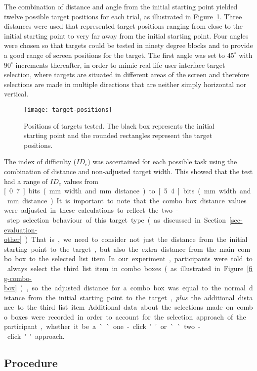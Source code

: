 \documentclass{elsart}
\begin{document}
The combination of distance and angle from the initial starting point
yielded twelve possible target positions for each trial, as illustrated
in Figure~\ref{fig-target-positions}. Three distances were used that
represented target positions ranging from close to the initial starting
point to very far away from the initial starting point. Four angles were
chosen so that targets could be tested in ninety degree blocks and to
provide a good range of screen positions for the target. The first angle
was set to \(45^{\circ}\) with \(90^{\circ}\) increments thereafter, in
order to mimic real life user interface target selection, where targets
are situated in different areas of the screen and therefore selections
are made in multiple directions that are neither simply horizontal nor
vertical.


\begin{figure}
	\centering
	\texttt{[image: target-positions]}
	\caption{Positions of targets tested. The black box represents the
	initial starting point and the rounded rectangles represent the
	target positions.}
	\label{fig-target-positions}
\end{figure}


The index of difficulty (\(\mathit{ID}_{e}\)) was ascertained for each
possible task using the combination of distance and non-adjusted target
width. This showed that the test had a range of \(\mathit{ID}_{e}\)
values from \unit[0.7]{bits} (\unit[63]{mm} width and \unit[160]{mm}
distance) to \unit[5.4]{bits} (\unit[4]{mm} width and \unit[40]{mm}
distance). It is important to note that the combo box distance values
were adjusted in these calculations to reflect the two-step selection
behaviour of this target type (as discussed in
Section~\ref{sec-evaluation-other}). That is, we need to consider not
just the distance from the initial starting point to the target, but
also the extra distance from the main combo box to the selected list
item. In our experiment, participants were told to always select the
third list item in combo boxes (as illustrated in
Figure~\ref{fig-combo-box}), so the adjusted distance for a combo box
was equal to the normal distance from the initial starting point to the
target, \emph{plus} the additional distance to the third list item.
Additional data about the selections made on combo boxes were recorded
in order to account for the selection approach of the participant,
whether it be a ``one-click'' or ``two-click'' approach.


\subsection{Procedure}
\label{sec-method-procedure}
\end{document}
